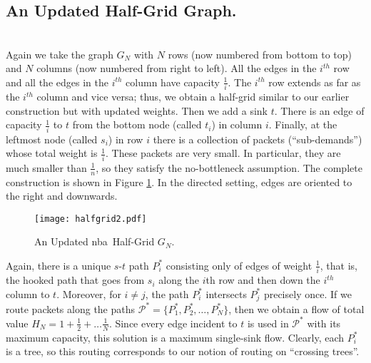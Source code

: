 \documentclass[12pt]{article}
\newcommand{\nba}{{\sc nba}}
\begin{document}
\subsection{{An Updated Half-Grid Graph.}}\ \\
Again we take the graph $G_N$ with $N$ rows (now numbered from
 bottom to top) and $N$ columns (now numbered from right to left).  All the edges
in the $i^{th}$ row and all the edges in the $i^{th}$ column have capacity
$\frac{1}{i}$.  The $i^{th}$ row extends as far as the $i^{th}$ column and vice
versa; thus, we obtain a half-grid similar to our earlier construction but with updated  weights.
 Then we add a sink $t$.
There is an edge of capacity $\frac{1}{i}$ to $t$ from the bottom node (called $t_i$) in column $i$.
Finally, at the leftmost node (called $s_i$) in row $i$ there is a collection of packets (``sub-demands'')
whose total weight is $\frac{1}{i}$. These packets are very small. In particular,
they are much smaller than $\frac{1}{n}$, so they satisfy the no-bottleneck assumption.
The complete construction is shown in Figure \ref{fig.grid2}.
In the directed setting, edges are oriented to the right and downwards.


\begin{figure}[h]
\begin{center}
\texttt{[image: halfgrid2.pdf]}
\caption{\label{fig.grid2} An Updated \nba \ Half-Grid $G_N$.}
\end{center}
\end{figure}

Again, there is a unique $s\mbox{-}t$ path $P^*_i$ consisting only of edges of
weight $\frac{1}{i}$, that is, the hooked path that goes from $s_i$ along the
$i$th row and then down the $i^{th}$ column to $t$.
Moreover, for $i \neq j$, the path $P^*_i$ intersects $P^*_j$ precisely once.
If we route packets along the paths
$\mathcal{P}^*=\{P^*_1,P^*_2,\dots,P^*_N\}$, then we obtain a  flow of total value $H_N
=1+\frac12+\ldots \frac{1}{N}$.  Since every edge incident to $t$ is used in
$\mathcal{P}^*$ with its maximum capacity, this solution is a maximum single-sink flow.
Clearly, each $P^*_i$ is a tree, so this routing corresponds to our notion of routing on ``crossing trees''.
\end{document}
